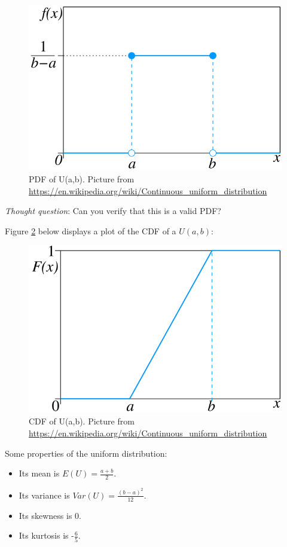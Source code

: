 \documentclass[
]{book}
\providecommand{\tightlist}{%
  \setlength{\itemsep}{0pt}\setlength{\parskip}{0pt}}
\begin{document}
\begin{figure}
\centering
\includegraphics{images/04-U.png}
\caption{\label{fig:4-U}PDF of U(a,b). Picture from \url{https://en.wikipedia.org/wiki/Continuous_uniform_distribution}}
\end{figure}

\emph{Thought question}: Can you verify that this is a valid PDF?

Figure \ref{fig:4-Ucdf} below displays a plot of the CDF of a \(U(a,b)\):

\begin{figure}
\centering
\includegraphics{images/04-Ucdf.png}
\caption{\label{fig:4-Ucdf}CDF of U(a,b). Picture from \url{https://en.wikipedia.org/wiki/Continuous_uniform_distribution}}
\end{figure}

Some properties of the uniform distribution:

\begin{itemize}
\tightlist
\item
  Its mean is \(E(U) = \frac{a+b}{2}\).
\item
  Its variance is \(Var(U) = \frac{(b-a)^2}{12}\).
\item
  Its skewness is 0.
\item
  Its kurtosis is -\(\frac{6}{5}\).
\end{itemize}
\end{document}

